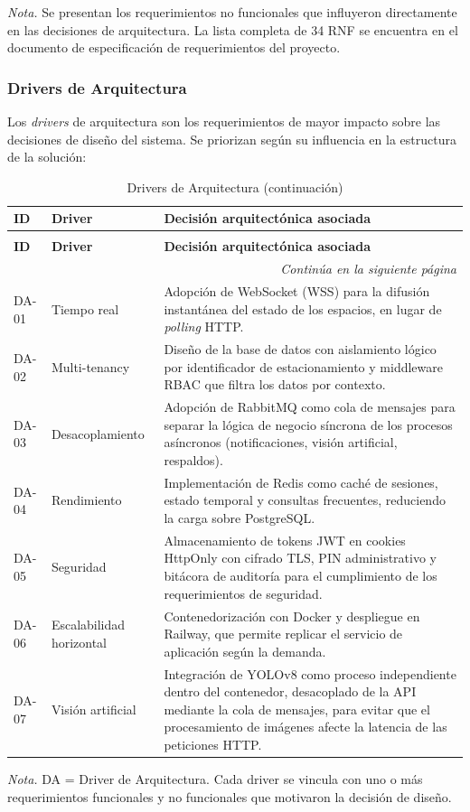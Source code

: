 \textit{Nota.} Se presentan los requerimientos no funcionales que influyeron directamente en las decisiones de arquitectura. La lista completa de 34 RNF se encuentra en el documento de especificación de requerimientos del proyecto.

\subsubsection{Drivers de Arquitectura}

Los \textit{drivers} de arquitectura son los requerimientos de mayor impacto sobre las decisiones de diseño del sistema. Se priorizan según su influencia en la estructura de la solución:

\begin{longtable}{p{1.2cm} p{2.5cm} p{10cm}}
\caption{Drivers de Arquitectura} \\
\toprule
\textbf{ID} & \textbf{Driver} & \textbf{Decisión arquitectónica asociada} \\
\midrule
\endfirsthead

\caption[]{Drivers de Arquitectura (continuación)} \\
\toprule
\textbf{ID} & \textbf{Driver} & \textbf{Decisión arquitectónica asociada} \\
\midrule
\endhead

\midrule
\multicolumn{3}{r}{\footnotesize\textit{Continúa en la siguiente página}} \\
\endfoot

\bottomrule
\endlastfoot

DA-01 & Tiempo real & Adopción de WebSocket (WSS) para la difusión instantánea del estado de los espacios, en lugar de \textit{polling} HTTP. \\
\midrule
DA-02 & Multi-tenancy & Diseño de la base de datos con aislamiento lógico por identificador de estacionamiento y middleware RBAC que filtra los datos por contexto. \\
\midrule
DA-03 & Desacoplamiento & Adopción de RabbitMQ como cola de mensajes para separar la lógica de negocio síncrona de los procesos asíncronos (notificaciones, visión artificial, respaldos). \\
\midrule
DA-04 & Rendimiento & Implementación de Redis como caché de sesiones, estado temporal y consultas frecuentes, reduciendo la carga sobre PostgreSQL. \\
\midrule
DA-05 & Seguridad & Almacenamiento de tokens JWT en cookies HttpOnly con cifrado TLS, PIN administrativo y bitácora de auditoría para el cumplimiento de los requerimientos de seguridad. \\
\midrule
DA-06 & Escalabilidad horizontal & Contenedorización con Docker y despliegue en Railway, que permite replicar el servicio de aplicación según la demanda. \\
\midrule
DA-07 & Visión artificial & Integración de YOLOv8 como proceso independiente dentro del contenedor, desacoplado de la API mediante la cola de mensajes, para evitar que el procesamiento de imágenes afecte la latencia de las peticiones HTTP. \\
\end{longtable}

\textit{Nota.} DA = Driver de Arquitectura. Cada driver se vincula con uno o más requerimientos funcionales y no funcionales que motivaron la decisión de diseño.
